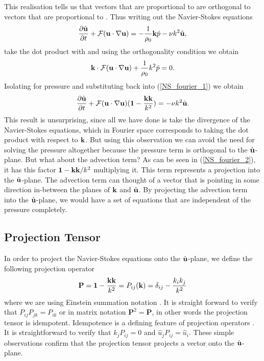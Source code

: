 This realisation tells us that vectors that are proportional to \uhatm are orthogonal to vectors that are proportional to \kvecm. Thus writing out the Navier-Stokes equations
\begin{align}
\frac{\partial \hat{\textbf{u}}}{\partial t} + \mathcal{F}(\textbf{u}\cdot\nabla\textbf{u}) = -\frac{1}{\rho_{0}} \textbf{k}\hat{p} - \nu k^{2}\hat{\textbf{u}}\label{NS_fourier_1},
\end{align}
take the dot product with \kvecm and using the orthogonality condition we obtain
\begin{align}
\textbf{k}\cdot\mathcal{F}(\textbf{u}\cdot\nabla\textbf{u}) + \frac{1}{\rho_{0}}k^{2}\hat{p}=0\label{pressure_fourier_1}.
\end{align}
Isolating for pressure and substituting back into (\ref{NS_fourier_1}) we obtain
\begin{align}
\frac{\partial \hat{\textbf{u}}}{\partial t} + \mathcal{F}(\textbf{u}\cdot\nabla\textbf{u})(\textbf{1}-\frac{\textbf{k}\textbf{k}}{k^{2}})= - \nu k^{2}\hat{\textbf{u}}\label{NS_fourier_2}.
\end{align}
This result is unsurprising, since all we have done is take the divergence of the Navier-Stokes equations, which in Fourier space corresponds to taking the dot product with respect to $\textbf{k}$. But using this observation we can avoid the need for solving the pressure altogether because the pressure term is orthogonal to the $\hat{\textbf{u}}$-plane. But what about the advection term? As can be seen in (\ref{NS_fourier_2}), it has this factor $\textbf{1} - \textbf{k}\textbf{k}/k^{2}$ multiplying it. This term represents a projection into the $\hat{\textbf{u}}$-plane. The advection term can thought of a vector that is pointing in some direction in-between the planes of $\textbf{k}$ and $\hat{\textbf{u}}$. By projecting the advection term into the $\hat{\textbf{u}}$-plane, we would have a set of equations that are independent of the pressure completely.

\subsection{Projection Tensor}
In order to project the Navier-Stokes equations onto the $\hat{\textbf{u}}$-plane, we define the following projection operator
\begin{align}
\textbf{P}=\textbf{1} - \frac{\textbf{k}\textbf{k}}{k^{2}} = P_{ij}(\textbf{k}) = \delta_{ij} - \frac{k_{i}k_{j}}{k^{2}}
\end{align}
where we are using Einstein summation notation \cite{lesieur,wald}. It is straight forward to verify that $P_{ij}P_{jk}=P_{ik}$ or in matrix notation $\textbf{P}^{2}=\textbf{P}$, in other words the projection tensor is idempotent. Idempotence is a defining feature of projection operators \cite{MeyerLinAlg}. It is straightforward to verify that $k_{j}P_{ij}=0$ and $\hat{u}_{j}P_{ij}=\hat{u}_{i}$. These simple observations confirm that the projection tensor projects a vector onto the $\hat{\textbf{u}}$-plane. 

